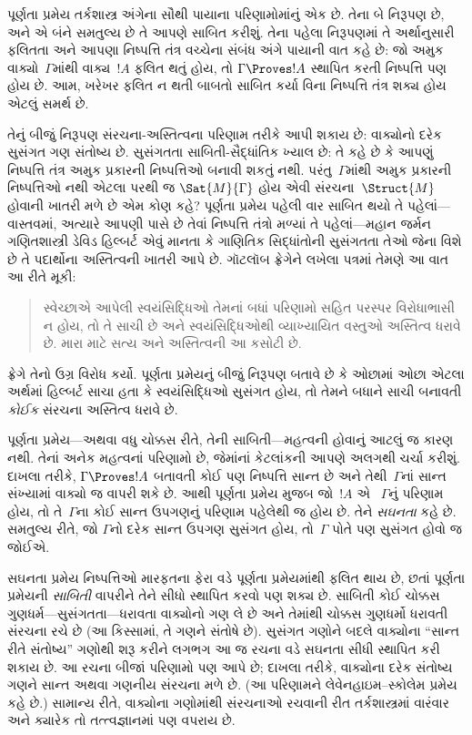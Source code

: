 પૂર્ણતા પ્રમેય તર્કશાસ્ત્ર અંગેના સૌથી પાયાના પરિણામોમાંનું એક છે.
તેના બે નિરૂપણ છે, અને એ બંને સમતુલ્ય છે તે આપણે સાબિત કરીશું. તેના
પહેલા નિરૂપણમાં તે અર્થાનુસારી ફલિતતા અને આપણા નિષ્પત્તિ તંત્ર
વચ્ચેના સંબંધ અંગે પાયાની વાત કહે છે: જો અમુક વાક્યો~$\Gamma$માંથી
વાક્ય~$!A$ ફલિત થતું હોય, તો $\Gamma \Proves !A$ સ્થાપિત કરતી
નિષ્પત્તિ પણ હોય છે. આમ, ખરેખર ફલિત ન થતી બાબતો સાબિત કર્યા વિના
નિષ્પત્તિ તંત્ર શક્ય હોય એટલું સમર્થ છે.

તેનું બીજું નિરૂપણ સંરચના-અસ્તિત્વના પરિણામ તરીકે આપી શકાય છે:
વાક્યોનો દરેક સુસંગત ગણ સંતોષ્ય છે. સુસંગતતા સાબિતી-સૈદ્ધાંતિક
ખ્યાલ છે: તે કહે છે કે આપણું નિષ્પત્તિ તંત્ર અમુક પ્રકારની
નિષ્પત્તિઓ બનાવી શકતું નથી. પરંતુ~$\Gamma$માંથી અમુક પ્રકારની
નિષ્પત્તિઓ નથી એટલા પરથી જ $\Sat{M}{\Gamma}$
હોય એવી સંરચના~$\Struct{M}$
હોવાની ખાતરી મળે છે એમ કોણ કહે? પૂર્ણતા પ્રમેય પહેલી વાર સાબિત થયો
તે પહેલાં—વાસ્તવમાં, અત્યારે આપણી પાસે છે તેવાં નિષ્પત્તિ તંત્રો
મળ્યાં તે પહેલાં—મહાન જર્મન ગણિતશાસ્ત્રી ડેવિડ હિલ્બર્ટ એવું માનતા કે
ગાણિતિક સિદ્ધાંતોની સુસંગતતા તેઓ જેના વિશે છે તે પદાર્થોના અસ્તિત્વની
ખાતરી આપે છે. ગૉટલૉબ ફ્રેગેને લખેલા પત્રમાં તેમણે આ વાત આ રીતે મૂકી:
\begin{quote}
  સ્વેચ્છાએ આપેલી સ્વયંસિદ્ધિઓ તેમનાં બધાં પરિણામો સહિત પરસ્પર
  વિરોધાભાસી ન હોય, તો તે સાચી છે અને સ્વયંસિદ્ધિઓથી વ્યાખ્યાયિત
  વસ્તુઓ અસ્તિત્વ ધરાવે છે. મારા માટે સત્ય અને અસ્તિત્વની આ કસોટી છે.
\end{quote}
ફ્રેગે તેનો ઉગ્ર વિરોધ કર્યો. પૂર્ણતા પ્રમેયનું બીજું નિરૂપણ બતાવે છે
કે ઓછામાં ઓછા એટલા અર્થમાં હિલ્બર્ટ સાચા હતા કે સ્વયંસિદ્ધિઓ સુસંગત
હોય, તો તેમને બધાને સાચી બનાવતી \emph{કોઈક}
સંરચના અસ્તિત્વ ધરાવે છે.

પૂર્ણતા પ્રમેય—અથવા વધુ ચોક્કસ રીતે, તેની સાબિતી—મહત્વની હોવાનું આટલું
જ કારણ નથી. તેનાં અનેક મહત્વનાં પરિણામો છે, જેમાંનાં કેટલાંકની આપણે
અલગથી ચર્ચા કરીશું. દાખલા તરીકે, $\Gamma \Proves !A$ બતાવતી કોઈ પણ
નિષ્પત્તિ સાન્ત છે અને તેથી~$\Gamma$નાં સાન્ત સંખ્યામાં
વાક્યો જ વાપરી શકે છે. આથી પૂર્ણતા પ્રમેય મુજબ જો~$!A$ એ
~$\Gamma$નું પરિણામ હોય, તો તે~$\Gamma$ના કોઈ સાન્ત ઉપગણનું પરિણામ
પહેલેથી જ હોય છે. તેને \emph{સઘનતા} કહે છે. સમતુલ્ય રીતે, જો
$\Gamma$નો દરેક સાન્ત ઉપગણ સુસંગત હોય, તો~$\Gamma$ પોતે પણ સુસંગત
હોવો જ જોઈએ.

સઘનતા પ્રમેય નિષ્પત્તિઓ મારફતના ફેરા વડે પૂર્ણતા પ્રમેયમાંથી
ફલિત થાય છે, છતાં પૂર્ણતા પ્રમેયની \emph{સાબિતી} વાપરીને તેને સીધો
સ્થાપિત કરવો પણ શક્ય છે. સાબિતી કોઈ ચોક્કસ ગુણધર્મ—સુસંગતતા—ધરાવતા
વાક્યોનો ગણ લે છે અને તેમાંથી ચોક્કસ ગુણધર્મો ધરાવતી
સંરચના રચે છે (આ કિસ્સામાં, તે ગણને સંતોષે છે). સુસંગત ગણોને
બદલે વાક્યોના ``સાન્ત રીતે સંતોષ્ય'' ગણોથી શરૂ કરીને લગભગ આ જ
રચના વડે સઘનતા સીધી સ્થાપિત કરી શકાય છે.
આ રચના બીજાં પરિણામો પણ આપે છે; દાખલા તરીકે,
  વાક્યોના દરેક સંતોષ્ય ગણને સાન્ત અથવા ગણનીય
  સંરચના મળે છે. (આ પરિણામને લેવેનહાઇમ--સ્કોલેમ પ્રમેય કહે છે.)
  સામાન્ય રીતે, વાક્યોના ગણોમાંથી સંરચનાઓ રચવાની રીત
  તર્કશાસ્ત્રમાં વારંવાર અને ક્યારેક તો તત્ત્વજ્ઞાનમાં પણ વપરાય છે.
\endgroup


